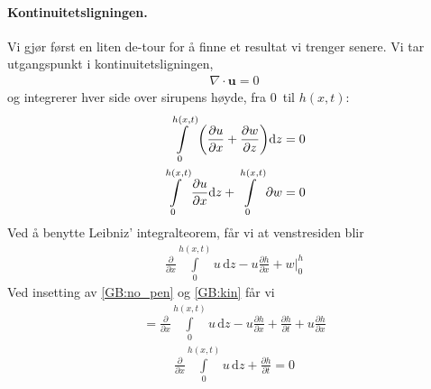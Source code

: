 \documentclass[12p,a4paper]{article}
\renewcommand{\b}{\boldsymbol}
\renewcommand{\d}{\mathrm{d}}
\begin{document}
\paragraph{Kontinuitetsligningen.}
Vi gjør først en liten de-tour for å finne et resultat vi trenger senere. Vi tar utgangspunkt i kontinuitetsligningen,
\begin{align*}
    \nabla \cdot \b u = 0
\end{align*}
og integrerer hver side over sirupens høyde, fra $0$ til $h(x,t)$:
\begin{align*}
    \int\limits_0^{h(x,t)}\qty(\frac{\partial u}{\partial x} + \frac{\partial w}{\partial z})\d z = 0 \\
    \int\limits_0^{h(x,t)}\frac{\partial u}{\partial x}\d z + \int\limits_0^{h(x,t)}\partial w = 0
\end{align*}
Ved å benytte Leibniz' integralteorem, får vi at venstresiden blir
\begin{align*}
    \frac{\partial}{\partial x}\int\limits_0^{h(x,t)}u\, \d z - u\frac{\partial h}{\partial x} + w\Big|_0^h
\end{align*}
Ved insetting av \ref{GB:no_pen} og \ref{GB:kin} får vi
\begin{align*}
    = \frac{\partial}{\partial x}\int\limits_0^{h(x,t)}u\, \d z - u\frac{\partial h}{\partial x} + \frac{\partial h}{\partial t} + u \frac{\partial h}{\partial x}
\end{align*}
\begin{align}\label{eqn:int_u}
    \frac{\partial}{\partial x}\int\limits_0^{h(x,t)}u\, \d z + \frac{\partial h}{\partial t} = 0
\end{align}
\end{document}
